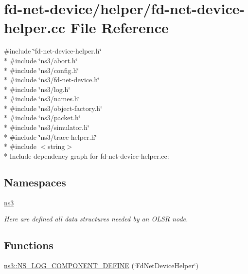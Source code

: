 \hypertarget{fd-net-device-helper_8cc}{}\section{fd-\/net-\/device/helper/fd-\/net-\/device-\/helper.cc File Reference}
\label{fd-net-device-helper_8cc}
{\ttfamily \#include \char`\"{}fd-\/net-\/device-\/helper.\+h\char`\"{}}\\*
{\ttfamily \#include \char`\"{}ns3/abort.\+h\char`\"{}}\\*
{\ttfamily \#include \char`\"{}ns3/config.\+h\char`\"{}}\\*
{\ttfamily \#include \char`\"{}ns3/fd-\/net-\/device.\+h\char`\"{}}\\*
{\ttfamily \#include \char`\"{}ns3/log.\+h\char`\"{}}\\*
{\ttfamily \#include \char`\"{}ns3/names.\+h\char`\"{}}\\*
{\ttfamily \#include \char`\"{}ns3/object-\/factory.\+h\char`\"{}}\\*
{\ttfamily \#include \char`\"{}ns3/packet.\+h\char`\"{}}\\*
{\ttfamily \#include \char`\"{}ns3/simulator.\+h\char`\"{}}\\*
{\ttfamily \#include \char`\"{}ns3/trace-\/helper.\+h\char`\"{}}\\*
{\ttfamily \#include $<$string$>$}\\*
Include dependency graph for fd-\/net-\/device-\/helper.cc\+:
\subsection*{Namespaces}
\begin{DoxyCompactItemize}
\item 
 \hyperlink{namespacens3}{ns3}
\begin{DoxyCompactList}\small\item\em Here are defined all data structures needed by an O\+L\+SR node. \end{DoxyCompactList}\end{DoxyCompactItemize}
\subsection*{Functions}
\begin{DoxyCompactItemize}
\item 
\hyperlink{namespacens3_aa3988a01f9a92e74b6f8d088f9e284d2}{ns3\+::\+N\+S\+\_\+\+L\+O\+G\+\_\+\+C\+O\+M\+P\+O\+N\+E\+N\+T\+\_\+\+D\+E\+F\+I\+NE} (\char`\"{}Fd\+Net\+Device\+Helper\char`\"{})
\end{DoxyCompactItemize}
